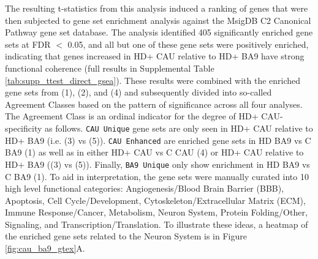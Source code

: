 \documentclass[fleqn,10pt,table]{wlscirep}
\begin{document}
The resulting t-statistics from this analysis induced a ranking of genes that were then subjected to gene set enrichment analysis against the MsigDB C2 Canonical Pathway gene set database.
The analysis identified 405 significantly enriched gene sets at FDR $<$ 0.05, and all but one of these gene sets were positively enriched, indicating that genes increased in HD+ CAU relative to HD+ BA9 have strong functional coherence (full results in Supplemental Table \ref{tab:supp_ttest_direct_gsea}).
These results were combined with the enriched gene sets from (1), (2), and (4) and subsequently divided into so-called Agreement Classes based on the pattern of significance across all four analyses.
The Agreement Class is an ordinal indicator for the degree of HD+ CAU-specificity as follows.
\texttt{CAU Unique} gene sets are only seen in HD+ CAU relative to HD+ BA9 (i.e. (3) vs (5)).
\texttt{CAU Enhanced} are enriched gene sets in HD BA9 vs C BA9 (1) as well as in either HD+ CAU vs C CAU (4) or HD+ CAU relative to HD+ BA9 ((3) vs (5)).
Finally, \texttt{BA9 Unique} only show enrichment in HD BA9 vs C BA9 (1).
To aid in interpretation, the gene sets were manually curated into 10 high level functional categories: Angiogenesis/Blood Brain Barrier (BBB), Apoptosis, Cell Cycle/Development, Cytoskeleton/Extracellular Matrix (ECM), Immune Response/Cancer, Metabolism, Neuron System, Protein Folding/Other, Signaling, and Transcription/Translation.
To illustrate these ideas, a heatmap of the enriched gene sets related to the Neuron System is in Figure \ref{fig:cau_ba9_gtex}A.
\end{document}
